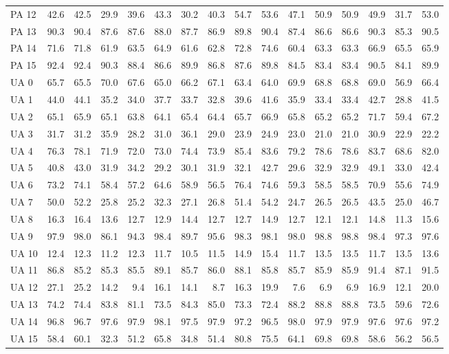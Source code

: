 \documentclass[a4paper,10pt,DIV=16]{scrartcl}
\begin{document}
\begin{table}[h]
\begin{tabular}{lrrrrrrrrrrrrrrr}
    PA 12 & 42.6 & 42.5 & 29.9 & 39.6 & 43.3 & 30.2 & 40.3 & 54.7 & 53.6 & 47.1 & 50.9 & 50.9 & 49.9 & 31.7 & 53.0 \\
    PA 13 & 90.3 & 90.4 & 87.6 & 87.6 & 88.0 & 87.7 & 86.9 & 89.8 & 90.4 & 87.4 & 86.6 & 86.6 & 90.3 & 85.3 & 90.5 \\
    PA 14 & 71.6 & 71.8 & 61.9 & 63.5 & 64.9 & 61.6 & 62.8 & 72.8 & 74.6 & 60.4 & 63.3 & 63.3 & 66.9 & 65.5 & 65.9 \\
    PA 15 & 92.4 & 92.4 & 90.3 & 88.4 & 86.6 & 89.9 & 86.8 & 87.6 & 89.8 & 84.5 & 83.4 & 83.4 & 90.5 & 84.1 & 89.9 \\
    UA 0 & 65.7 & 65.5 & 70.0 & 67.6 & 65.0 & 66.2 & 67.1 & 63.4 & 64.0 & 69.9 & 68.8 & 68.8 & 69.0 & 56.9 & 66.4 \\
    UA 1 & 44.0 & 44.1 & 35.2 & 34.0 & 37.7 & 33.7 & 32.8 & 39.6 & 41.6 & 35.9 & 33.4 & 33.4 & 42.7 & 28.8 & 41.5 \\
    UA 2 & 65.1 & 65.9 & 65.1 & 63.8 & 64.1 & 65.4 & 64.4 & 65.7 & 66.9 & 65.8 & 65.2 & 65.2 & 71.7 & 59.4 & 67.2 \\
    UA 3 & 31.7 & 31.2 & 35.9 & 28.2 & 31.0 & 36.1 & 29.0 & 23.9 & 24.9 & 23.0 & 21.0 & 21.0 & 30.9 & 22.9 & 22.2 \\
    UA 4 & 76.3 & 78.1 & 71.9 & 72.0 & 73.0 & 74.4 & 73.9 & 85.4 & 83.6 & 79.2 & 78.6 & 78.6 & 83.7 & 68.6 & 82.0 \\
    UA 5 & 40.8 & 43.0 & 31.9 & 34.2 & 29.2 & 30.1 & 31.9 & 32.1 & 42.7 & 29.6 & 32.9 & 32.9 & 49.1 & 33.0 & 42.4 \\
    UA 6 & 73.2 & 74.1 & 58.4 & 57.2 & 64.6 & 58.9 & 56.5 & 76.4 & 74.6 & 59.3 & 58.5 & 58.5 & 70.9 & 55.6 & 74.9 \\
    UA 7 & 50.0 & 52.2 & 25.8 & 25.2 & 32.3 & 27.1 & 26.8 & 51.4 & 54.2 & 24.7 & 26.5 & 26.5 & 43.5 & 25.0 & 46.7 \\
    UA 8 & 16.3 & 16.4 & 13.6 & 12.7 & 12.9 & 14.4 & 12.7 & 12.7 & 14.9 & 12.7 & 12.1 & 12.1 & 14.8 & 11.3 & 15.6 \\
    UA 9 & 97.9 & 98.0 & 86.1 & 94.3 & 98.4 & 89.7 & 95.6 & 98.3 & 98.1 & 98.0 & 98.8 & 98.8 & 98.4 & 97.3 & 97.6 \\
    UA 10 & 12.4 & 12.3 & 11.2 & 12.3 & 11.7 & 10.5 & 11.5 & 14.9 & 15.4 & 11.7 & 13.5 & 13.5 & 11.7 & 13.5 & 13.6 \\
    UA 11 & 86.8 & 85.2 & 85.3 & 85.5 & 89.1 & 85.7 & 86.0 & 88.1 & 85.8 & 85.7 & 85.9 & 85.9 & 91.4 & 87.1 & 91.5 \\
    UA 12 & 27.1 & 25.2 & 14.2 & 9.4 & 16.1 & 14.1 & 8.7 & 16.3 & 19.9 & 7.6 & 6.9 & 6.9 & 16.9 & 12.1 & 20.0 \\
    UA 13 & 74.2 & 74.4 & 83.8 & 81.1 & 73.5 & 84.3 & 85.0 & 73.3 & 72.4 & 88.2 & 88.8 & 88.8 & 73.5 & 59.6 & 72.6 \\
    UA 14 & 96.8 & 96.7 & 97.6 & 97.9 & 98.1 & 97.5 & 97.9 & 97.2 & 96.5 & 98.0 & 97.9 & 97.9 & 97.6 & 97.6 & 97.2 \\
    UA 15 & 58.4 & 60.1 & 32.3 & 51.2 & 65.8 & 34.8 & 51.4 & 80.8 & 75.5 & 64.1 & 69.8 & 69.8 & 58.6 & 56.2 & 56.5 \\
  \end{tabular}
\end{table}
\end{document}

